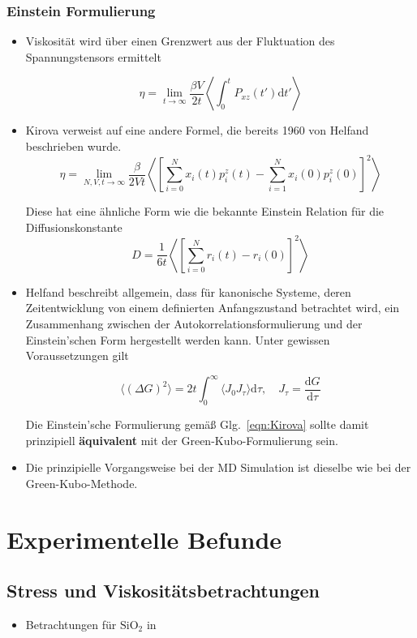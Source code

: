 \documentclass[a4paper, 10pt, 
               numbers=noenddot, toc=graduated,
               headsepline=true, footsepline=true,
               twoside=false, titlepage=true, 
               bibliography=totoc]{scrartcl}
\newcommand{\refeqn}[1]  {Glg.~\ref{#1}}
\begin{document}
	\subsubsection{Einstein Formulierung}
		\begin{itemize}
			 \item Viskosität wird über einen Grenzwert aus der Fluktuation des Spannungstensors ermittelt \cite{Tenney2010}
			 
			 	\begin{equation}
					\eta = \lim_{t\to\infty} \frac{\beta V}{2 t} \left\langle \int_0^t P_{xz}(t')\mathrm{d}t' \right\rangle
				\end{equation}
				
			 \item Kirova \cite{Kirova2015} verweist auf eine andere Formel, die bereits 1960 von Helfand \cite{Helfand1960} beschrieben wurde.
			    \begin{equation}\label{eqn:Kirova}
					\eta = \lim_{N,V,t\to\infty} \frac{\beta}{2 V t} \left\langle \left[\sum_{i=0}^N x_i(t) p_i^z(t) - \sum_{i=1}^N x_i(0) p_i^z(0) \right]^2 \right\rangle
				\end{equation}
				
				Diese hat eine ähnliche Form wie die bekannte Einstein Relation für die Diffusionskonstante
				\begin{equation}
					D = \frac{1}{6t} \left\langle \left[ \sum_{i=0}^N r_i(t) - r_i(0) \right]^2 \right\rangle
				\end{equation}
				
			\item Helfand \cite{Helfand1960} beschreibt allgemein, dass für kanonische Systeme, deren Zeitentwicklung von einem definierten Anfangszustand betrachtet wird, ein Zusammenhang zwischen der Autokorrelationsformulierung und der Einstein'schen Form hergestellt werden kann. Unter gewissen Voraussetzungen gilt
			
				\begin{equation}
					\langle (\Delta G)^2 \rangle = 2 t \int_0^\infty \langle J_0 J_\tau \rangle \mathrm{d} \tau,\quad J_\tau = \frac{ \mathrm{d} G }{\mathrm{d} \tau}
				\end{equation}
				
				Die Einstein'sche Formulierung gemäß \refeqn{eqn:Kirova} sollte damit prinzipiell \textbf{äquivalent} mit der Green-Kubo-Formulierung sein.
				
			 
			 \item Die prinzipielle Vorgangsweise bei der MD Simulation ist dieselbe wie bei der Green-Kubo-Methode.
		\end{itemize}

\section{Experimentelle Befunde}

\subsection{Stress und Viskositätsbetrachtungen}
	\begin{itemize}
		\item Betrachtungen für $\mathrm{SiO_2}$ in \cite{Snoeks2000}
	\end{itemize}





\end{document}
